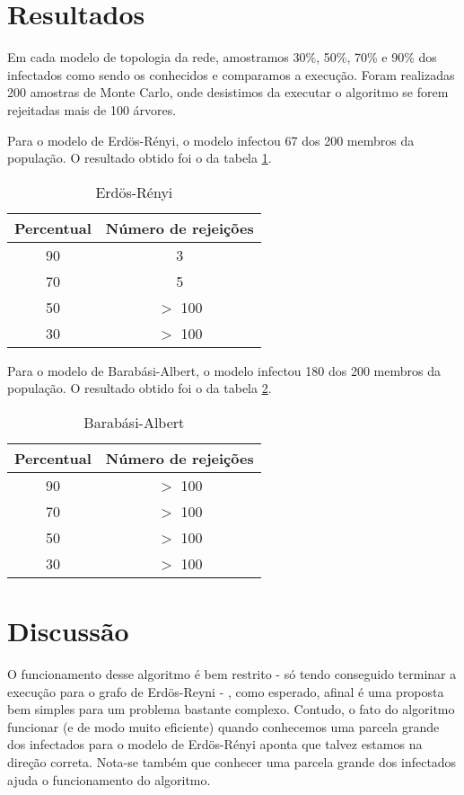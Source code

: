 \documentclass{article}
\begin{document}
\section{Resultados}

Em cada modelo de topologia da rede, amostramos 30\%, 50\%, 70\% e 90\% dos infectados como sendo os conhecidos e comparamos a execução. Foram realizadas 200 amostras de Monte Carlo, onde desistimos da executar o algoritmo se forem rejeitadas mais de 100 árvores. 

Para o modelo de Erdös-Rényi, o modelo infectou 67 dos 200 membros da população. O resultado obtido foi o da tabela \ref{table:1}.

\begin{table}[h!]
\centering
\begin{tabular}{||c | c |} 
 \hline
 Percentual & Número de rejeições \\ [0.5ex] 
 \hline\hline
 90 & 3  \\ 
 70 & 5   \\
 50 & $>$ 100  \\
 30 & $>$ 100  \\
 \hline
\end{tabular}
\caption{Erdös-Rényi}
\label{table:1}
\end{table}

Para o modelo de Barabási-Albert, o modelo infectou 180 dos 200 membros da população. O resultado obtido foi o da tabela \ref{table:2}.

\begin{table}[h!]
\centering
\begin{tabular}{||c | c |} 
 \hline
 Percentual & Número de rejeições \\ [0.5ex] 
 \hline\hline
 90 & $>$ 100  \\ 
 70 & $>$ 100   \\
 50 & $>$ 100  \\
 30 & $>$ 100  \\
 \hline
\end{tabular}
\caption{Barabási-Albert}
\label{table:2}
\end{table}


\section{Discussão}

O funcionamento desse algoritmo é bem restrito - só tendo conseguido terminar a execução para o grafo de Erdös-Reyni - , como esperado, afinal é uma proposta bem simples para um problema bastante complexo. Contudo, o fato do algoritmo funcionar (e de modo muito eficiente) quando conhecemos uma parcela grande dos infectados para o modelo de Erdös-Rényi aponta que talvez estamos na direção correta. Nota-se também que conhecer uma parcela grande dos infectados ajuda o funcionamento do algoritmo.
\end{document}
